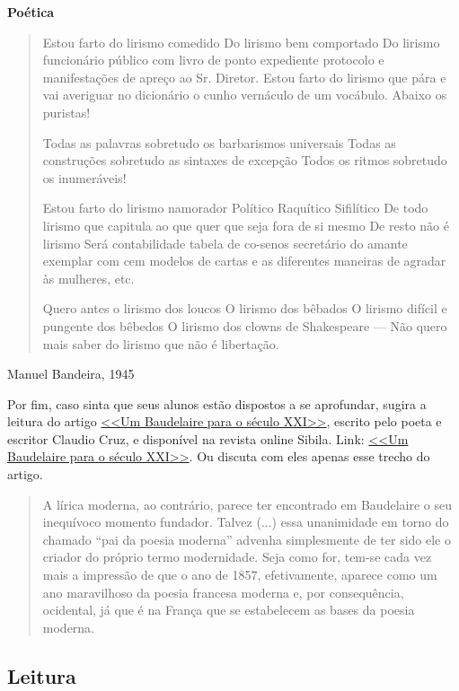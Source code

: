 \documentclass[12pt]{extarticle}
\begin{document}
\textbf{Poética}
\thispagestyle{empty}
\begin{verse}

Estou farto do lirismo comedido
Do lirismo bem comportado
Do lirismo funcionário público com livro de ponto expediente
protocolo e manifestações de apreço ao Sr. Diretor.
Estou farto do lirismo que pára e vai averiguar no dicionário 
o cunho vernáculo de um vocábulo.
Abaixo os puristas!

Todas as palavras sobretudo os barbarismos universais
Todas as construções sobretudo as sintaxes de excepção
Todos os ritmos sobretudo os inumeráveis!

Estou farto do lirismo namorador
Político
Raquítico
Sifilítico
De todo lirismo que capitula ao que quer que seja fora
de si mesmo
De resto não é lirismo
Será contabilidade tabela de co-senos secretário
do amante exemplar com cem modelos de cartas
e as diferentes maneiras de agradar às mulheres, etc.

Quero antes o lirismo dos loucos
O lirismo dos bêbados
O lirismo difícil e pungente dos bêbedos
O lirismo dos clowns de Shakespeare
--- Não quero mais saber do lirismo que não é libertação.
\end{verse}
\bigskip \hfill Manuel Bandeira, 1945

\pagebreak

Por fim, caso sinta que seus alunos estão dispostos a se aprofundar, 
sugira a leitura do artigo \href{}{<<Um Baudelaire para o século XXI>>}, 
escrito pelo poeta e escritor Claudio Cruz, e disponível na 
revista online Sibila. Link: \href{http://sibila.com.br/novos-e-criticos/um-baudelaire-para-o-seculo-xxi/3579}{<<Um Baudelaire para o século XXI>>}. Ou discuta com eles apenas esse trecho do artigo.

\begin{quote}
A lírica moderna, ao contrário, parece ter encontrado em Baudelaire 
o seu inequívoco momento fundador. Talvez (...)
essa unanimidade em torno do chamado “pai da poesia moderna” advenha simplesmente 
de ter sido ele o criador do próprio termo modernidade. Seja como for, 
tem-se cada vez mais a impressão de que o ano de 1857, efetivamente, aparece como 
um ano maravilhoso da poesia francesa moderna e, por consequência, ocidental, já que 
é na França que se estabelecem as bases da poesia moderna.
\end{quote}





\subsection{Leitura}
\end{document}
